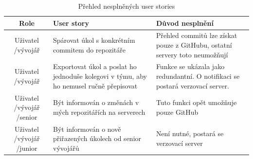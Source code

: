 \begin{table}[h]
\begin{center}
	\begin{tabular}{| c | p{5cm} | p{5cm} |}
	\hline
	Role & User story & Důvod nesplnění \\
	\hline
	\hline
	Uživatel \slash vývojář & Spárovat úkol s konkrétním commitem do repozitáře & Přehled commitů lze získat pouze z GitHubu, ostatní servery toto neumožňují \\
	\hline
	Uživatel \slash vývojář & Exportovat úkol a poslat ho jednoduše kolegovi v týmu, aby ho nemusel ručně přepisovat & Funkce se ukázala jako redundantní. O notifikaci se postará verzovací server. \\
	\hline
	Uživatel \slash  vývojář \slash  senior & Být informován o změnách v mých repozitářích na serverech & Tuto funkci opět umožňuje pouze GitHub \\
	\hline
	Uživatel \slash  vývojář \slash  junior & Být informován o nově přiřazených úkolech od senior vývojářů & Není nutné, postará se verzovací server \\
	\hline
	\end{tabular}
\end{center}
\caption{Přehled nesplněných user stories}
\label{tab:failed-accept-tests}
\end{table}